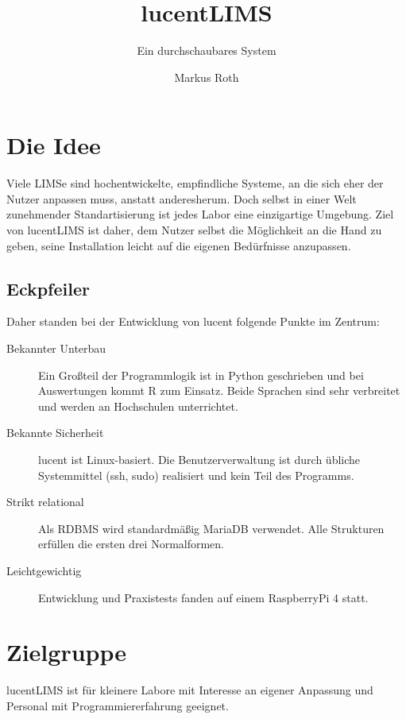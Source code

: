 \documentclass[11pt]{scrartcl} %
\title{lucentLIMS}
\subtitle{Ein durchschaubares System}
\author{Markus Roth}
\begin{document}
\maketitle

\section{Die Idee}
Viele LIMSe sind hochentwickelte, empfindliche Systeme, an die sich eher der Nutzer anpassen muss, anstatt anderesherum. Doch selbst in einer Welt zunehmender Standartisierung ist jedes Labor eine einzigartige Umgebung. Ziel von lucentLIMS ist daher, dem Nutzer selbst die Möglichkeit an die Hand zu geben, seine Installation leicht auf die eigenen Bedürfnisse anzupassen.

\subsection{Eckpfeiler}
Daher standen bei der Entwicklung von lucent folgende Punkte im Zentrum:

\begin{description}

\item[Bekannter Unterbau] Ein Großteil der Programmlogik ist in Python geschrieben und bei Auswertungen kommt R zum Einsatz.
Beide Sprachen sind sehr verbreitet und werden an Hochschulen unterrichtet.

\item[Bekannte Sicherheit] lucent ist Linux-basiert.
Die Benutzerverwaltung ist durch übliche Systemmittel (ssh, sudo) realisiert und kein Teil des Programms.

\item[Strikt relational] Als RDBMS wird standardmäßig MariaDB verwendet.
Alle Strukturen erfüllen die ersten drei Normalformen.

\item[Leichtgewichtig] Entwicklung und Praxistests fanden auf einem RaspberryPi 4 statt.

\end{description}

\section{Zielgruppe}
lucentLIMS ist für kleinere Labore mit Interesse an eigener Anpassung und Personal mit Programmiererfahrung geeignet.
\end{document}
